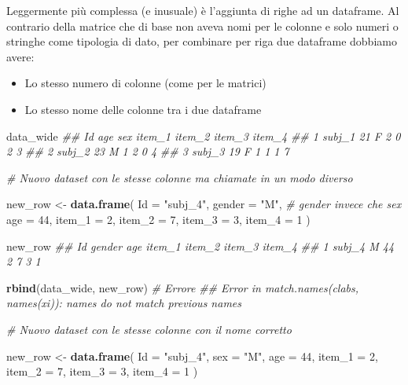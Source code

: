 \documentclass[
]{book}
\newenvironment{Shaded}{\begin{snugshade}}{\end{snugshade}}
\newcommand{\CommentTok}[1]{\textcolor[rgb]{0.56,0.35,0.01}{\textit{#1}}}
\newcommand{\DataTypeTok}[1]{\textcolor[rgb]{0.13,0.29,0.53}{#1}}
\newcommand{\DecValTok}[1]{\textcolor[rgb]{0.00,0.00,0.81}{#1}}
\newcommand{\KeywordTok}[1]{\textcolor[rgb]{0.13,0.29,0.53}{\textbf{#1}}}
\newcommand{\NormalTok}[1]{#1}
\newcommand{\StringTok}[1]{\textcolor[rgb]{0.31,0.60,0.02}{#1}}
\providecommand{\tightlist}{%
  \setlength{\itemsep}{0pt}\setlength{\parskip}{0pt}}
\begin{document}
Leggermente più complessa (e inusuale) è l'aggiunta di righe ad un dataframe. Al contrario della matrice che di base non aveva nomi per le colonne e solo numeri o stringhe come tipologia di dato, per combinare per riga due dataframe dobbiamo avere:

\begin{itemize}
\tightlist
\item
  Lo stesso numero di colonne (come per le matrici)
\item
  Lo stesso nome delle colonne tra i due dataframe
\end{itemize}

\begin{Shaded}
\begin{Highlighting}[]
\NormalTok{data_wide}
\CommentTok{##       Id age sex item_1 item_2 item_3 item_4}
\CommentTok{## 1 subj_1  21   F      2      0      2      3}
\CommentTok{## 2 subj_2  23   M      1      2      0      4}
\CommentTok{## 3 subj_3  19   F      1      1      1      7}

\CommentTok{# Nuovo dataset con le stesse colonne ma chiamate in un modo diverso}

\NormalTok{new_row <-}\StringTok{ }\KeywordTok{data.frame}\NormalTok{(}
  \DataTypeTok{Id =} \StringTok{"subj_4"}\NormalTok{,}
  \DataTypeTok{gender =} \StringTok{"M"}\NormalTok{, }\CommentTok{# gender invece che sex}
  \DataTypeTok{age =} \DecValTok{44}\NormalTok{,}
  \DataTypeTok{item_1 =} \DecValTok{2}\NormalTok{,}
  \DataTypeTok{item_2 =} \DecValTok{7}\NormalTok{,}
  \DataTypeTok{item_3 =} \DecValTok{3}\NormalTok{,}
  \DataTypeTok{item_4 =} \DecValTok{1}
\NormalTok{)}

\NormalTok{new_row}
\CommentTok{##       Id gender age item_1 item_2 item_3 item_4}
\CommentTok{## 1 subj_4      M  44      2      7      3      1}

\KeywordTok{rbind}\NormalTok{(data_wide, new_row) }\CommentTok{# Errore}
\CommentTok{## Error in match.names(clabs, names(xi)): names do not match previous names}

\CommentTok{# Nuovo dataset con le stesse colonne con il nome corretto}

\NormalTok{new_row <-}\StringTok{ }\KeywordTok{data.frame}\NormalTok{(}
  \DataTypeTok{Id =} \StringTok{"subj_4"}\NormalTok{,}
  \DataTypeTok{sex =} \StringTok{"M"}\NormalTok{,}
  \DataTypeTok{age =} \DecValTok{44}\NormalTok{,}
  \DataTypeTok{item_1 =} \DecValTok{2}\NormalTok{,}
  \DataTypeTok{item_2 =} \DecValTok{7}\NormalTok{,}
  \DataTypeTok{item_3 =} \DecValTok{3}\NormalTok{,}
  \DataTypeTok{item_4 =} \DecValTok{1}
\NormalTok{)}


\end{Highlighting}
\end{Shaded}
\end{document}
